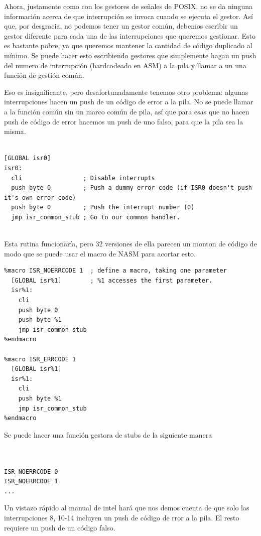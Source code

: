 \documentclass{report}
\begin{document}
Ahora, justamente como con los gestores de señales de POSIX, no se da ninguna información acerca de que interrupción se invoca cuando se ejecuta el gestor. Así que, por desgracia, no podemos tener un gestor común, debemos escribir un gestor diferente para cada una de las interrupciones que queremos gestionar. Esto es bastante pobre, ya que queremos mantener la cantidad de código duplicado al mínimo. Se puede hacer esto escribiendo gestores que simplemente hagan un push del numero de interrupción (hardcodeado en ASM) a la pila y llamar a un una función de gestión común.

Eso es insignificante, pero desafortunadamente tenemos otro problema: algunas interrupciones hacen un push de un código de error a la pila. No se puede llamar a la función común sin un marco común de pila, así que para esas que no hacen push de código de error hacemos un push de uno falso, para que la pila sea la misma.

\begin{lstlisting}

[GLOBAL isr0]
isr0:
  cli                 ; Disable interrupts
  push byte 0         ; Push a dummy error code (if ISR0 doesn't push it's own error code)
  push byte 0         ; Push the interrupt number (0)
  jmp isr_common_stub ; Go to our common handler.
  
\end{lstlisting}

Esta rutina funcionaría, pero 32 versiones de ella parecen un monton de código de modo que se puede usar el macro de NASM para acortar esto.

\begin{lstlisting}
%macro ISR_NOERRCODE 1  ; define a macro, taking one parameter
  [GLOBAL isr%1]        ; %1 accesses the first parameter.
  isr%1:
    cli
    push byte 0
    push byte %1
    jmp isr_common_stub
%endmacro

%macro ISR_ERRCODE 1
  [GLOBAL isr%1]
  isr%1:
    cli
    push byte %1
    jmp isr_common_stub
%endmacro
\end{lstlisting}

Se puede hacer una función gestora de stubs de la siguiente manera

\begin{lstlisting}


ISR_NOERRCODE 0
ISR_NOERRCODE 1
...

\end{lstlisting}


Un vistazo rápido al manual de intel hará que nos demos cuenta de que solo las interrupciones 8, 10-14 incluyen un push de código de rror a la pila. El resto requiere un push de un código falso.
\end{document}
